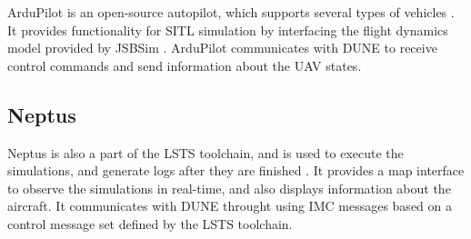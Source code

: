 ArduPilot is an open-source autopilot, which supports several types of vehicles \cite{ARDUPILOT}. It provides functionality for SITL simulation by interfacing the flight dynamics model provided by JSBSim \cite{JSBSim}. ArduPilot communicates with DUNE to receive control commands and send information about the UAV states.


\subsection{Neptus}

Neptus is also a part of the LSTS toolchain, and is used to execute the simulations, and generate logs after they are finished \cite{NEPTUS}. It provides a map interface to observe the simulations in real-time, and also displays information about the aircraft. It communicates with DUNE throught using IMC messages based on a control message set defined by the LSTS toolchain.
